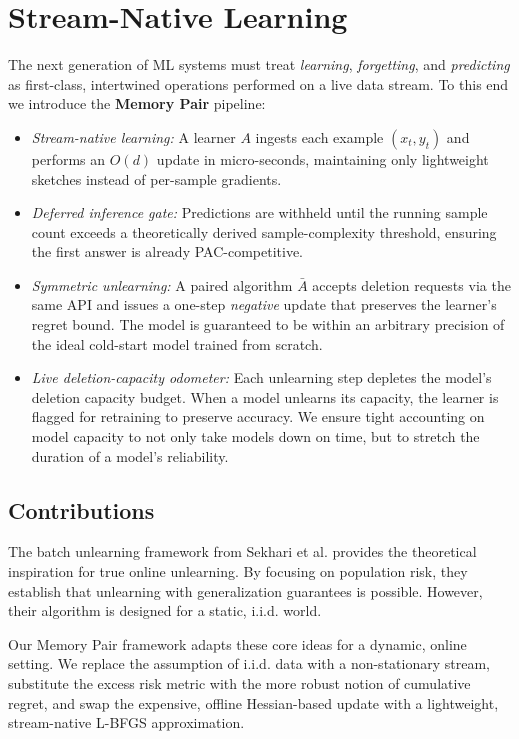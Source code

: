 \documentclass[a4paper,12pt]{article}
\begin{document}
\section{Stream-Native Learning}
\label{sec:stream-native}

The next generation of ML systems must treat \textit{learning}, \textit{forgetting}, and \textit{predicting} as first-class, intertwined operations performed on a live data stream.  To this end we introduce the \textbf{Memory Pair} pipeline:

\begin{itemize}
    \item \textit{Stream-native learning:} A learner $A$ ingests each example $(x_t,y_t)$ and performs an $O(d)$ update in micro-seconds, maintaining only lightweight sketches instead of per-sample gradients.
    \item \textit{Deferred inference gate:} Predictions are withheld until the running sample count exceeds a theoretically derived sample-complexity threshold, ensuring the first answer is already PAC-competitive.
    \item \textit{Symmetric unlearning:} A paired algorithm $\bar{A}$ accepts deletion requests via the same API and issues a one-step \textit{negative} update that preserves the learner’s regret bound. The model is guaranteed to be within an arbitrary precision of the ideal cold-start model trained from scratch.
    \item \textit{Live deletion-capacity odometer:} Each unlearning step depletes the model's deletion capacity budget. When a model unlearns its capacity, the learner is flagged for retraining to preserve accuracy. We ensure tight accounting on model capacity to not only take models down on time, but to stretch the duration of a model's reliability.
\end{itemize}

\subsection{Contributions}

The batch unlearning framework from Sekhari et al. provides the theoretical inspiration for true online unlearning. By focusing on population risk, they establish that unlearning with generalization guarantees is possible. However, their algorithm is designed for a static, i.i.d. world.

Our Memory Pair framework adapts these core ideas for a dynamic, online setting. We replace the assumption of i.i.d. data with a non-stationary stream, substitute the excess risk metric with the more robust notion of cumulative regret, and swap the expensive, offline Hessian-based update with a lightweight, stream-native L-BFGS approximation. 
\end{document}
